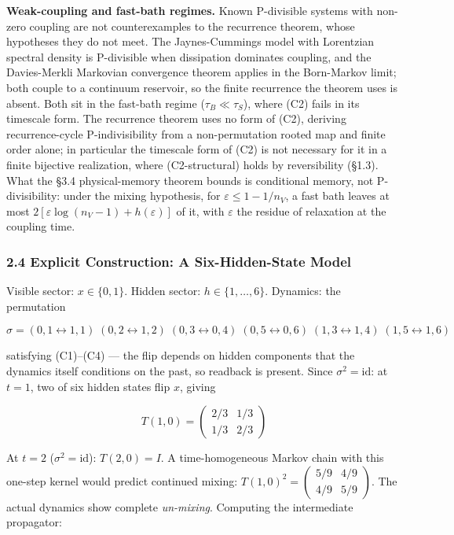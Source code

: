 \documentclass[
]{article}
\begin{document}
\textbf{Weak-coupling and fast-bath regimes.} Known P-divisible systems
with non-zero coupling are not counterexamples to the recurrence
theorem, whose hypotheses they do not meet. The Jaynes-Cummings model
with Lorentzian spectral density is P-divisible when dissipation
dominates coupling, and the Davies-Merkli Markovian convergence theorem
applies in the Born-Markov limit; both couple to a continuum reservoir,
so the finite recurrence the theorem uses is absent. Both sit in the
fast-bath regime (\(\tau_B \ll \tau_S\)), where (C2) fails in its
timescale form. The recurrence theorem uses no form of (C2), deriving
recurrence-cycle P-indivisibility from a non-permutation rooted map and
finite order alone; in particular the timescale form of (C2) is not
necessary for it in a finite bijective realization, where
(C2-structural) holds by reversibility (§1.3). What the §3.4
physical-memory theorem bounds is conditional memory, not
P-divisibility: under the mixing hypothesis, for
\(\varepsilon \leq 1 - 1/n_V\), a fast bath leaves at most
\(2[\varepsilon \log(n_V - 1) + h(\varepsilon)]\) of it, with
\(\varepsilon\) the residue of relaxation at the coupling time.

\hypertarget{explicit-construction-a-six-hidden-state-model}{%
\subsubsection{2.4 Explicit Construction: A Six-Hidden-State
Model}\label{explicit-construction-a-six-hidden-state-model}}

Visible sector: \(x \in \{0, 1\}\). Hidden sector:
\(h \in \{1, \ldots, 6\}\). Dynamics: the permutation

\[\sigma = (0{,}1 \leftrightarrow 1{,}1)\;(0{,}2 \leftrightarrow 1{,}2)\;(0{,}3 \leftrightarrow 0{,}4)\;(0{,}5 \leftrightarrow 0{,}6)\;(1{,}3 \leftrightarrow 1{,}4)\;(1{,}5 \leftrightarrow 1{,}6)\]

satisfying (C1)--(C4) --- the flip depends on hidden components that the
dynamics itself conditions on the past, so readback is present. Since
\(\sigma^2 = \text{id}\): at \(t = 1\), two of six hidden states flip
\(x\), giving

\[T(1,0) = \begin{pmatrix} 2/3 & 1/3 \\ 1/3 & 2/3 \end{pmatrix}\]

At \(t = 2\) (\(\sigma^2 = \text{id}\)): \(T(2,0) = I\). A
time-homogeneous Markov chain with this one-step kernel would predict
continued mixing:
\(T(1,0)^2 = \left(\begin{smallmatrix} 5/9 & 4/9 \\ 4/9 & 5/9 \end{smallmatrix}\right)\).
The actual dynamics show complete \emph{un-mixing}. Computing the
intermediate propagator:
\end{document}
